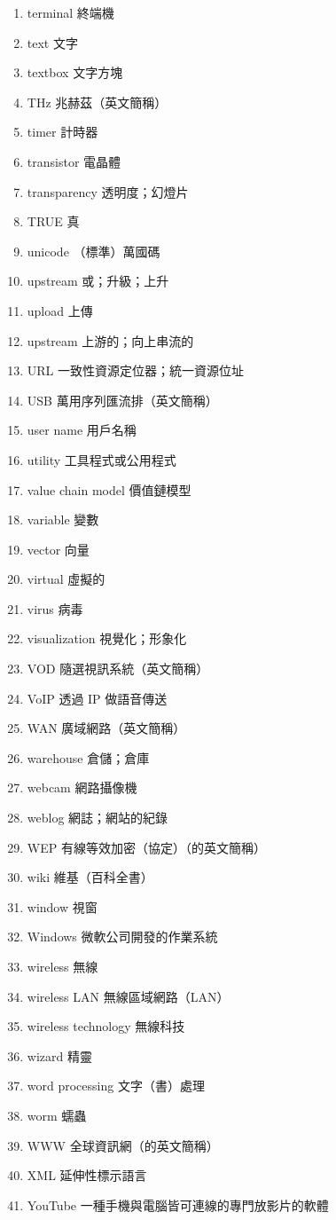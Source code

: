 \begin{enumerate}
  \item terminal 終端機
  \item text 文字
  \item textbox 文字方塊
  \item THz 兆赫茲（英文簡稱）
  \item timer 計時器
  \item transistor 電晶體
  \item transparency 透明度；幻燈片
  \item TRUE 真
  \item unicode （標準）萬國碼
  \item upstream 或；升級；上升
  \item upload 上傳
  \item upstream 上游的；向上串流的
  \item URL 一致性資源定位器；統一資源位址
  \item USB 萬用序列匯流排（英文簡稱）
  \item user name 用戶名稱
  \item utility 工具程式或公用程式
  \item value chain model 價值鏈模型
  \item variable 變數
  \item vector 向量
  \item virtual 虛擬的
  \item virus 病毒
  \item visualization 視覺化；形象化
  \item VOD 隨選視訊系統（英文簡稱）
  \item VoIP 透過 IP 做語音傳送
  \item WAN 廣域網路（英文簡稱）
  \item warehouse 倉儲；倉庫
  \item webcam 網路攝像機
  \item weblog 網誌；網站的紀錄
  \item WEP 有線等效加密（協定）（的英文簡稱）
  \item wiki 維基（百科全書）
  \item window 視窗
  \item Windows 微軟公司開發的作業系統
  \item wireless 無線
  \item wireless LAN 無線區域網路（LAN）
  \item wireless technology 無線科技
  \item wizard 精靈
  \item word processing 文字（書）處理
  \item worm 蠕蟲
  \item WWW 全球資訊網（的英文簡稱）
  \item XML 延伸性標示語言
  \item YouTube 一種手機與電腦皆可連線的專門放影片的軟體
\end{enumerate}
